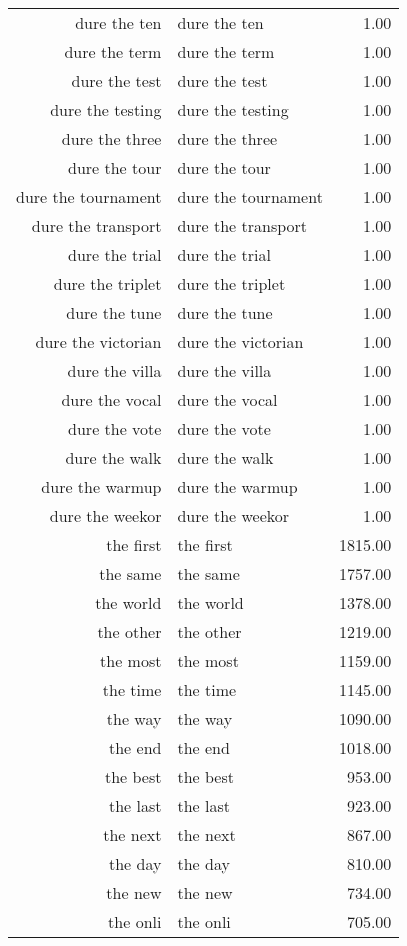 \begin{table}[ht]
\begin{tabular}{rlr}
  dure the ten & dure the ten & 1.00 \\ 
  dure the term & dure the term & 1.00 \\ 
  dure the test & dure the test & 1.00 \\ 
  dure the testing & dure the testing & 1.00 \\ 
  dure the three & dure the three & 1.00 \\ 
  dure the tour & dure the tour & 1.00 \\ 
  dure the tournament & dure the tournament & 1.00 \\ 
  dure the transport & dure the transport & 1.00 \\ 
  dure the trial & dure the trial & 1.00 \\ 
  dure the triplet & dure the triplet & 1.00 \\ 
  dure the tune & dure the tune & 1.00 \\ 
  dure the victorian & dure the victorian & 1.00 \\ 
  dure the villa & dure the villa & 1.00 \\ 
  dure the vocal & dure the vocal & 1.00 \\ 
  dure the vote & dure the vote & 1.00 \\ 
  dure the walk & dure the walk & 1.00 \\ 
  dure the warmup & dure the warmup & 1.00 \\ 
  dure the weekor & dure the weekor & 1.00 \\ 
  the first & the first & 1815.00 \\ 
  the same & the same & 1757.00 \\ 
  the world & the world & 1378.00 \\ 
  the other & the other & 1219.00 \\ 
  the most & the most & 1159.00 \\ 
  the time & the time & 1145.00 \\ 
  the way & the way & 1090.00 \\ 
  the end & the end & 1018.00 \\ 
  the best & the best & 953.00 \\ 
  the last & the last & 923.00 \\ 
  the next & the next & 867.00 \\ 
  the day & the day & 810.00 \\ 
  the new & the new & 734.00 \\ 
  the onli & the onli & 705.00 \\ 

\end{tabular}
\end{table}
